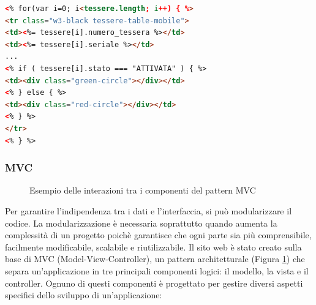\documentclass[12pt]{report}
\begin{document}
\pagebreak

\begin{lstlisting}[language=HTML, morekeywords={if, else}, caption={Uso di \emph{EJS} nel lato client. Il codice JavaScript all'interno della pagina HTML è racchiuso tra \textquotedblleft{} $<$\% \%$>$ \textquotedblright{} e l'oggetto \textquotedblleft{} tessere \textquotedblright{} è stato passato dal server in formato JSON. Gli oggetti passati dal server sono racchiusi tra \textquotedblleft{} $<$\%= \%$>$ \textquotedblright{} }, label={lst:ejs_client}]
<% for(var i=0; i<tessere.length; i++) { %>
<tr class="w3-black tessere-table-mobile">
<td><%= tessere[i].numero_tessera %></td>
<td><%= tessere[i].seriale %></td>
...
<% if ( tessere[i].stato === "ATTIVATA" ) { %>
<td><div class="green-circle"></div></td>
<% } else { %>
<td><div class="red-circle"></div></td>
<% } %>
</tr>
<% } %>
\end{lstlisting}

\subsubsection*{MVC}

\begin{figure}[H]
	\caption{Esempio delle interazioni tra i componenti del pattern MVC}
	\label{fig:mvc}
\end{figure}

Per garantire l'indipendenza tra i dati e l'interfaccia, si può modularizzare il codice. La modularizzazione è necessaria soprattutto quando aumenta la complessità di un progetto poichè garantisce che ogni parte sia più comprensibile, facilmente modificabile, scalabile e riutilizzabile.
Il sito web è stato creato sulla base di MVC (Model-View-Controller), un pattern architetturale (Figura \ref{fig:mvc}) che separa un'applicazione in tre principali componenti logici: il modello, la vista e il controller. Ognuno di questi componenti è progettato per gestire diversi aspetti specifici dello sviluppo di un'applicazione:
\end{document}
